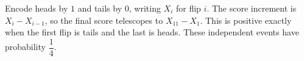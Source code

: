 Encode heads by $1$ and tails by $0$, writing $X_i$ for flip $i$. The score increment is $X_i-X_{i-1}$, so the final score telescopes to $X_{11}-X_1$. This is positive exactly when the first flip is tails and the last is heads. These independent events have probability $\boxed{\dfrac{1}{4}}$.
